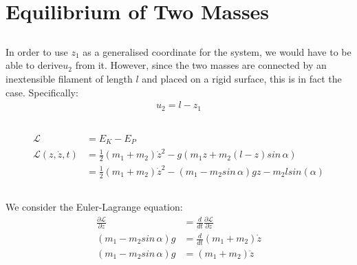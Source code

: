 \documentclass{article}
\begin{document}
\subsection{} %



\subsection{} %

\section{Equilibrium of Two Masses}

\subsection{} %

In order to use $z_1$ as a generalised coordinate for the system, we would have to be able to derive$u_2$ from it. However, since the two masses are connected by an inextensible filament of length $l$ and placed on a rigid surface, this is in fact the case. Specifically:
\begin{align*}
	u_2 = l - z_1
\end{align*}

\subsection{} %

\begin{align*}
	\mathcal{L} &= E_{K} - E_P\\
	\mathcal{L}(z,\dot{z},t) &= \frac{1}{2}(m_1+m_2)\dot{z}^2 - g(m_1z + m_2(l-z)sin\,\alpha)\\
	&= \frac{1}{2}(m_1+m_2)\dot{z}^2 - (m_1 - m_2sin\,\alpha)g z - m_2 l sin(\alpha)
\end{align*}

\subsection{} %

We consider the Euler-Lagrange equation:
\begin{align*}
	\frac{\partial \mathcal{L}}{\partial z} &= \frac{d}{dt}\frac{\partial \mathcal{L}}{\partial \dot{z}}\\
	 (m_1 - m_2sin\,\alpha)g &= \frac{d}{dt}(m_1 + m_2)\dot{z}\\
	 (m_1 - m_2sin\,\alpha)g &= (m_1 + m_2)\ddot{z}
\end{align*}
\end{document}
